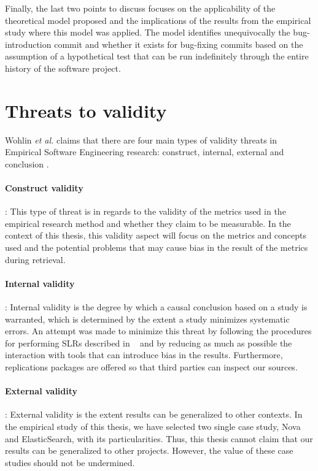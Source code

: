 \documentclass[a4paper, 12pt]{book}
\begin{document}
Finally, the last two points to discuss focuses on the applicability of the theoretical model proposed and the implications of the results from the empirical study where this model was applied. The model identifies unequivocally the bug-introduction commit and whether it exists for bug-fixing commits based on the assumption of a hypothetical test that can be run indefinitely through the entire history of the software project.  

\section{Threats to validity}
\label{sec:threats}

Wohlin \emph{et al.} claims that there are four main types of validity threats in Empirical Software Engineering research: construct, internal, external and conclusion \cite{wohlin2012experimentation}.

\paragraph{Construct validity}:  This type of threat is in regards to the validity of the metrics used in the empirical research method and whether they claim to be measurable. In the context of this thesis, this validity aspect will focus on the metrics and concepts used and the potential problems that may cause bias in the result of the metrics during retrieval.

\paragraph{Internal validity}: Internal validity is the degree by which a causal conclusion based on a study is warranted, which is determined by the extent a study minimizes systematic errors. An attempt was made to minimize this threat by following the procedures for performing SLRs described in ~\cite{madeyski2017would} and by reducing as much as possible the interaction with tools that can introduce bias in the results. Furthermore, replications packages are offered so that third parties can inspect our sources.

\paragraph{External validity}: External validity is the extent results can be generalized to other contexts. In the empirical study of this thesis, we have selected two single case study, Nova and ElasticSearch, with its particularities. Thus, this thesis cannot claim that our results can be generalized to other projects. However, the value of these case studies should not be undermined.
 
\end{document}
